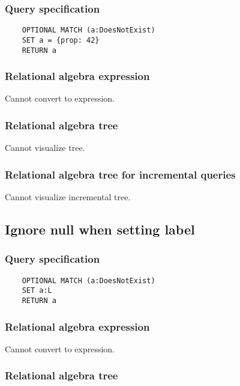 	\subsubsection*{Query specification}

	\begin{lstlisting}
	OPTIONAL MATCH (a:DoesNotExist)
	SET a = {prop: 42}
	RETURN a
	\end{lstlisting}


	\subsubsection*{Relational algebra expression}

	Cannot convert to expression.

	\subsubsection*{Relational algebra tree}

	Cannot visualize tree.

	\subsubsection*{Relational algebra tree for incremental queries}

	Cannot visualize incremental tree.
	\subsection{Ignore null when setting label}

	\subsubsection*{Query specification}

	\begin{lstlisting}
	OPTIONAL MATCH (a:DoesNotExist)
	SET a:L
	RETURN a
	\end{lstlisting}


	\subsubsection*{Relational algebra expression}

	Cannot convert to expression.

	\subsubsection*{Relational algebra tree}

